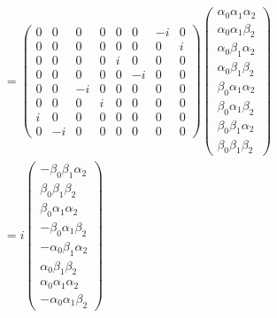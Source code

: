 \begin{align*}
&=
\begin{pmatrix}
0 & 0 & 0 & 0 & 0 & 0 & -i & 0\\
0 & 0 & 0 & 0 & 0 & 0 & 0 & i\\
0 & 0 & 0 & 0 & i & 0 & 0 & 0\\
0 & 0 & 0 & 0 & 0 & -i & 0 & 0\\
0 & 0 & -i & 0 & 0 & 0 & 0 & 0\\
0 & 0 & 0 & i & 0 & 0 & 0 & 0\\
i & 0 & 0 & 0 & 0 & 0 & 0 & 0\\
0 & -i & 0 & 0 & 0 & 0 & 0 & 0
\end{pmatrix}
\begin{pmatrix}
\alpha_0\alpha_1\alpha_2\\
\alpha_0\alpha_1\beta_2\\
\alpha_0\beta_1\alpha_2\\
\alpha_0\beta_1\beta_2\\
\beta_0\alpha_1\alpha_2\\
\beta_0\alpha_1\beta_2\\
\beta_0\beta_1\alpha_2\\
\beta_0\beta_1\beta_2
\end{pmatrix}\\
&= i
\begin{pmatrix}
-\beta_0\beta_1\alpha_2\\
\beta_0\beta_1\beta_2\\
\beta_0\alpha_1\alpha_2\\
-\beta_0\alpha_1\beta_2\\
- \alpha_0\beta_1\alpha_2\\
\alpha_0\beta_1\beta_2\\
\alpha_0\alpha_1\alpha_2\\
-\alpha_0\alpha_1\beta_2
\end{pmatrix}
\end{align*}
